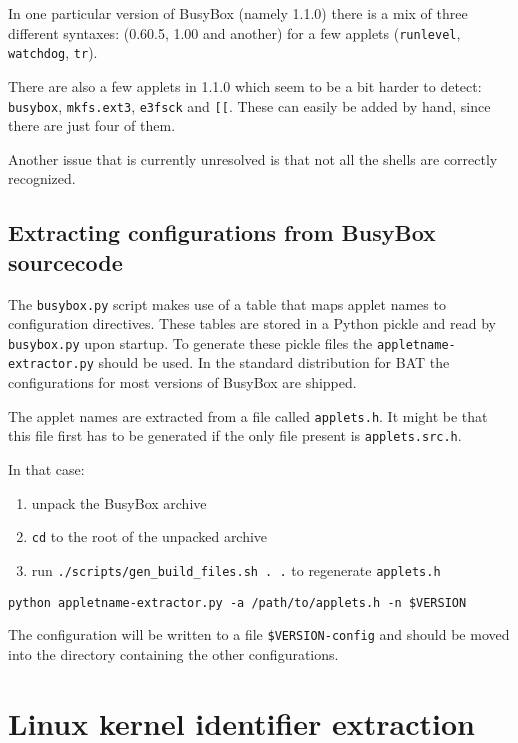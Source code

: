 \documentclass[10pt,a4paper]{article}
\begin{document}
In one particular version of BusyBox (namely 1.1.0) there is a mix of three
different syntaxes: (0.60.5, 1.00 and another) for a few applets
(\texttt{runlevel}, \texttt{watchdog}, \texttt{tr}).

There are also a few applets in 1.1.0 which seem to be a bit harder to detect:
\texttt{busybox}, \texttt{mkfs.ext3}, \texttt{e3fsck} and \texttt{[[}. These
can easily be added by hand, since there are just four of them.

Another issue that is currently unresolved is that not all the shells are
correctly recognized.

\subsection{Extracting configurations from BusyBox sourcecode}

The \texttt{busybox.py} script makes use of a table that maps applet names to
configuration directives. These tables are stored in a Python pickle and read
by \texttt{busybox.py} upon startup. To generate these pickle files the
\texttt{appletname-extractor.py} should be used. In the standard distribution
for BAT the configurations for most versions of BusyBox are shipped.

The applet names are extracted from a file called \texttt{applets.h}. It might
be that this file first has to be generated if the only file present is
\texttt{applets.src.h}.

In that case:

\begin{enumerate}
\item unpack the BusyBox archive
\item \texttt{cd} to the root of the unpacked archive
\item run \texttt{./scripts/gen\_build\_files.sh . .} to regenerate \texttt{applets.h}
\end{enumerate}

\begin{verbatim}
python appletname-extractor.py -a /path/to/applets.h -n $VERSION
\end{verbatim}

The configuration will be written to a file \texttt{\$VERSION-config} and
should be moved into the directory containing the other configurations.

\section{Linux kernel identifier extraction}
\end{document}
